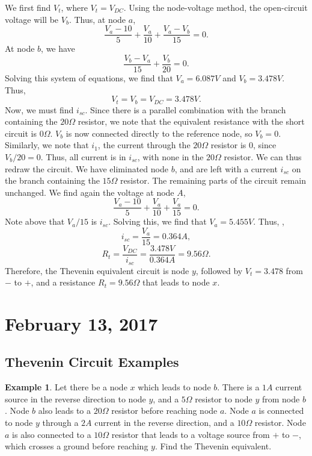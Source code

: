 \documentclass[11pt]{article}
\theoremstyle{plain} %
\theoremstyle{definition}
\theoremstyle{example}
\newtheorem*{example}{Example}
\theoremstyle{remark}
\begin{document}
We first find $V_t$, where $V_t = V_{DC}$. Using the node-voltage method, the open-circuit voltage will be $V_b$. Thus, at node $a$,
$$\frac{V_a-10}{5} + \frac{V_a}{10} + \frac{V_a-V_b}{15} = 0.$$
At node $b$, we have
$$\frac{V_b-V_a}{15} + \frac{V_b}{20} = 0.$$
Solving this system of equations, we find that $V_a = 6.087V$ and $V_b = 3.478V$. Thus, 
$$V_t = V_b = V_{DC} = 3.478V.$$
Now, we must find $i_{sc}$. Since there is a parallel combination with the branch containing the $20\Omega$ resistor, we note that the equivalent resistance with the short circuit is $0\Omega$. $V_b$ is now connected directly to the reference node, so $V_b = 0$. Similarly, we note that $i_1$, the current through the $20\Omega$ resistor is 0, since $V_b/20 = 0$. Thus, all current is in $i_{sc}$, with none in the $20\Omega$ resistor. We can thus redraw the circuit. We have eliminated node $b$, and are left with a current $i_{sc}$ on the branch containing the $15\Omega$ resistor. The remaining parts of the circuit remain unchanged. We find again the voltage at node $A$,
$$\frac{V_a-10}{5} + \frac{V_a}{10}+ \frac{V_a}{15} = 0.$$
Note above that $V_a/15$ is $i_{sc}$. Solving this, we find that $V_a = 5.455V$. Thus, ,
$$i_{sc} = \frac{V_a}{15} = 0.364A,$$
$$R_t = \frac{V_{DC}}{i_{sc}}  = \frac{3.478V}{0.364A} = 9.56\Omega.$$ Therefore, the Thevenin equivalent circuit is node $y$, followed by $V_t = 3.478$ from $-$ to $+$, and a resistance $R_t = 9.56\Omega$ that leads to node $x$. 



\section{February 13, 2017}

\subsection{Thevenin Circuit Examples}

\begin{example}
Let there be a node $x$ which leads to node $b$. There is a $1A$ current source in the reverse direction to node $y$, and a $5\Omega$ resistor to node $y$ from node $b$. Node $b$ also leads to a $20\Omega$ resistor before reaching node $a$. Node $a$ is connected to node $y$ through a $2A$ current in the reverse direction, and a $10\Omega$ resistor. Node $a$ is also connected to a $10\Omega$ resistor that leads to a voltage source from $+$ to $-$, which crosses a ground before reaching $y$. Find the Thevenin equivalent. 
\end{example}
\end{document}
